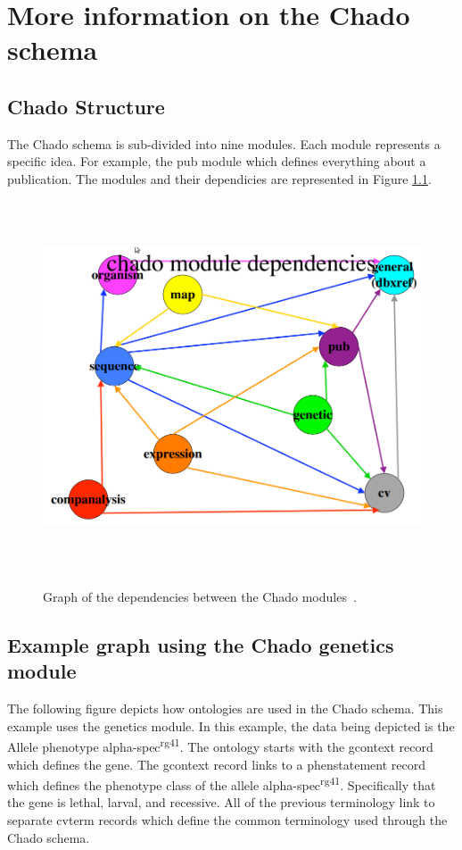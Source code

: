 \documentclass[12pt]{ucthesis}
\newcommand{\captionfonts}{\small\bf\ssp}
\begin{document}
\chapter{More information on the Chado schema}
\label{app:chado}

\section{Chado Structure}
The Chado schema is sub-divided into nine modules. Each module represents a specific idea. For example, the
pub module which defines everything about a publication. The modules and their dependicies are represented in Figure \ref{fig:chado-dep}.

\begin{figure}[h]
\begin{center}
\includegraphics[height=110mm]{chado-dep.png}
\captionfonts
\caption[Chado Module Dependencies]{Graph of the dependencies between the Chado modules~\cite{chado_new}.}
\label{fig:chado-dep}
\end{center}
\end{figure}

\section{Example graph using the Chado genetics module}
The following figure depicts how ontologies are used in the Chado schema. This example uses the genetics module. In this example, the data being depicted is the Allele phenotype alpha-spec\textsuperscript{rg41}.
The ontology starts with the gcontext record which defines the gene. The gcontext record links to a phenstatement record which defines the phenotype class of the allele alpha-spec\textsuperscript{rg41}.
Specifically that the gene is lethal, larval, and recessive. All of the previous terminology link to separate cvterm records which define the common terminology used through the Chado schema.
\end{document}
